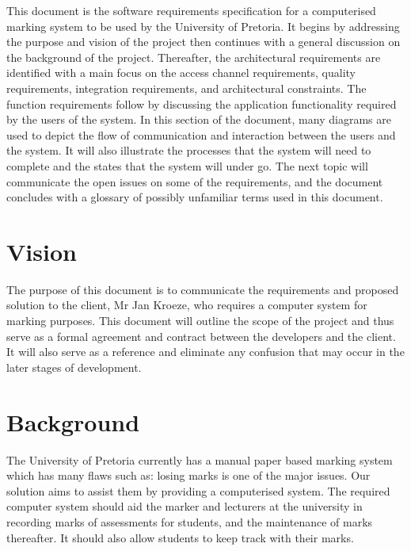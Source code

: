 \documentclass[12pt]{article}
\begin{document}
		This document is the software requirements specification for a computerised marking system to be used by the University of Pretoria. It begins by addressing the purpose and vision of the project then continues with a general discussion on the background of the project. Thereafter, the architectural requirements are identified with a main focus on the access channel requirements, quality requirements, integration requirements, and architectural constraints. The function requirements follow by discussing the application functionality required by the users of the system.  In this section of the document, many diagrams are used to depict the flow of communication and interaction between the users and the system. It will also illustrate the processes that the system will need to complete and the states that the system will under go.  The next topic will communicate the open issues on some of the requirements, and the document concludes with a glossary of possibly unfamiliar terms used in this document.
		
	\section{Vision}
	
		\vspace{0.2in}
		
		The purpose of this document is to communicate the requirements and proposed solution to the client, Mr Jan Kroeze, who requires a computer system for marking purposes. This document will outline the scope of the project and thus serve as a formal agreement and contract between the developers and the client. It will also serve as a reference and eliminate any confusion that may occur in the later stages of development.
	
	\section{Background}

		\vspace{0.2in}
		The University of Pretoria currently has a manual paper based marking system which has many flaws such as: losing marks is one of the major issues. Our solution aims to assist them by providing a computerised system. The required computer system should aid the marker and lecturers at the university in recording marks of assessments for students, and the maintenance of marks thereafter. It should also allow students to keep track with their marks.
		
\end{document}
